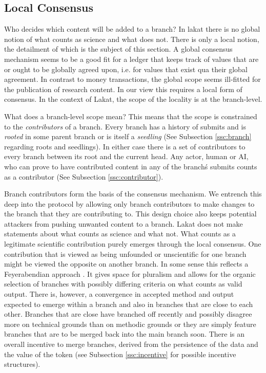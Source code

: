 \documentclass[14pt]{article}
\begin{document}
\subsection{Local Consensus}
\label{ssc:localconsensus}

Who decides which content will be added to a branch? In lakat there is no global notion of what counts as science and what does not. There is only a local notion, the detailment of which is the subject of this section. A global consensus mechanism seems to be a good fit for a ledger that keeps track of values that are or ought to be globally agreed upon, i.e. for values that exist qua their global agreement. In contrast to money transactions, the global scope seems ill-fitted for the publication of research content. In our view this requires a local form of consensus. In the context of Lakat, the scope of the locality is at the branch-level. 

What does a branch-level scope mean? This means that the scope is constrained to the \textit{contributors} of a branch. Every branch has a history of submits and is \textit{rooted} in some parent branch or is itself a \textit{seedling} (See Subsection \ref{ssc:branch} regarding roots and seedlings). In either case there is a set of contributors to every branch between its root and the current head. Any actor, human or AI, who can prove to have contributed content in any of the branch\'s submits counts as a contributor (See Subsection \ref{ssc:contributor}). 

Branch contributors form the basis of the consensus mechanism. We entrench this deep into the protocol by allowing only branch contributors to make changes to the branch that they are contributing to. This design choice also keeps potential attackers from pushing unwanted content to a branch. Lakat does not make statements about what counts as science and what not. What counts as a legitimate scientific contribution purely emerges through the local consensus. One contribution that is viewed as being unfounded or unscientific for one branch might be viewed the opposite on another branch. In some sense this reflects a Feyerabendian approach \cite{}. It gives space for pluralism and allows for the organic selection of branches with possibly differing criteria on what counts as valid output. There is, however, a convergence in accepted method and output expected to emerge within a branch and also in branches that are close to each other. Branches that are close have branched off recently and possibly disagree more on technical grounds than on methodic grounds or they are simply feature branches that are to be merged back into the main branch soon. There is an overall incentive to merge branches, derived from the persistence of the data and the value of the token (see Subsection \ref{ssc:incentive} for possible incentive structures). 
\end{document}
